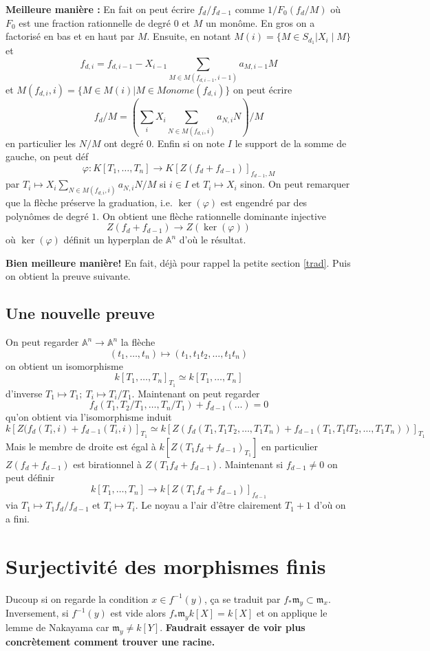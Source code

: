 \documentclass[a4paper,12pt]{book}
\newcommand{\A}{\mathbb{A}}
\newcommand{\m}{\mathfrak{m}}
\theoremstyle{plain}
\theoremstyle{definition}
\theoremstyle{remark}
\begin{document}
\textbf{Meilleure manière :} En fait on peut écrire $f_d/f_{d-1}$ comme
$1/F_0(f_d/M)$ où $F_0$ est une fraction rationnelle de degré $0$ et
$M$ un monôme. En gros on a factorisé en bas et en haut par $M$. Ensuite,
en notant $M(i)=\{M\in S_{d_1}| X_i\mid M\}$ et \[f_{d,i}= f_{d,i-1}-
X_{i-1}\sum_{M\in M(f_{d,i-1},i-1)} a_{M, i-1}M\] et $M(f_{d,i},i)=\{M\in M(i)| M\in Monome(f_{d,i})\}$
on peut écrire
\[f_d/M=\left(\sum_i X_i\sum_{N\in M(f_{d,i}, i)} a_{N, i} N\right)/M\]
en particulier les $N/M$ ont degré $0$. Enfin si on note $I$ le support 
de la somme de gauche, on peut déf 
\[\varphi\colon K[T_1,\ldots,T_n]\to K[Z(f_d+f_{d-1})]_{f_{d-1}, M}\]
par $T_i\mapsto X_i\sum_{N\in M(f_{d,i}, i)} a_{N, i} N/M$ si $i\in I$
et $T_i\mapsto X_i$ sinon. On peut remarquer que la flèche préserve la 
graduation, i.e. $\ker(\varphi)$ est engendré par des polynômes de degré
$1$. On obtient une flèche rationnelle dominante injective
\[Z(f_d+f_{d-1})\to Z(\ker(\varphi))\]
où $\ker(\varphi)$ définit un hyperplan de $\A^n$ d'où le résultat.

\textbf{Bien meilleure manière!} En fait, déjà pour rappel la petite 
section \ref{trad}. Puis on obtient la preuve suivante.

\subsection{Une nouvelle preuve}
On peut regarder $\A^n\to \A^n$ la flèche 
\[(t_1,\ldots,t_n)\mapsto (t_1, t_1t_2,\ldots, t_1t_n)\]
on obtient un isomorphisme 
\[k[T_1,\ldots, T_n]_{T_1}\simeq k[T_1,\ldots, T_n]\]
d'inverse $T_1\mapsto T_1;~T_i\mapsto T_i/T_1$. Maintenant on peut 
regarder \[f_d(T_1, T_2/T_1, \ldots, T_n/T_1)+f_{d-1}(\ldots)=0\] qu'on
obtient via l'isomorphisme induit 
\[k[Z(f_d(T_i,i)+f_{d-1}(T_i,i)]_{T_1}\simeq k[Z(f_d(T_1,T_1T_2,\ldots,T_1T_n)+f_{d-1}(T_1,T_1lT_2,\ldots, T_1T_n))]_{T_1}\]
Mais le membre de droite est égal à $k[Z(T_1f_d+f_{d-1})_{T_1}]$ en
particulier $Z(f_d+f_{d-1})$ est birationnel à $Z(T_1f_d+f_{d-1})$.
Maintenant si $f_{d-1}\ne 0$ on peut définir
\[k[T_1,\ldots, T_n]\to k[Z(T_1f_d+f_{d-1})]_{f_{d-1}}\]
via $T_1\mapsto T_1f_d/f_{d-1}$ et $T_i\mapsto T_i$. Le noyau a l'air 
d'être clairement $T_1+1$ d'où on a fini.

\section{Surjectivité des morphismes finis}
Ducoup si on regarde la condition $x\in f^{-1}(y)$, ça se traduit par
$f_*\m_y\subset \m_x$. Inversement, si $f^{-1}(y)$ est vide alors
$f_*\m_yk[X]=k[X]$ et on applique le lemme de Nakayama car 
$\m_y\ne k[Y]$. \textbf{Faudrait essayer de voir plus concrètement
comment trouver une racine.}
\end{document}
